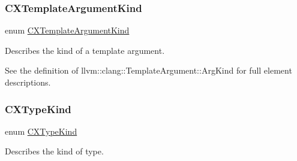 \subsubsection{\texorpdfstring{C\+X\+Template\+Argument\+Kind}{CXTemplateArgumentKind}}
{\footnotesize\ttfamily enum \hyperlink{group__CINDEX__TYPES_gaf23c39e68c1fc756643583b43ee3e494}{C\+X\+Template\+Argument\+Kind}}



Describes the kind of a template argument. 

See the definition of llvm\+::clang\+::\+Template\+Argument\+::\+Arg\+Kind for full element descriptions. \mbox{\label{group__CINDEX__TYPES_gaad39de597b13a18882c21860f92b095a}} 
\subsubsection{\texorpdfstring{C\+X\+Type\+Kind}{CXTypeKind}}
{\footnotesize\ttfamily enum \hyperlink{group__CINDEX__TYPES_gaad39de597b13a18882c21860f92b095a}{C\+X\+Type\+Kind}}



Describes the kind of type. 

